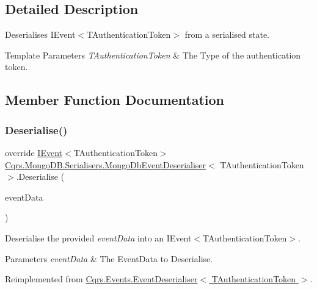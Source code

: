 \subsection{Detailed Description}
Deserialises I\+Event$<$\+T\+Authentication\+Token$>$ from a serialised state. 


\begin{DoxyTemplParams}{Template Parameters}
{\em T\+Authentication\+Token} & The Type of the authentication token.\\
\hline
\end{DoxyTemplParams}


\subsection{Member Function Documentation}
\mbox{\label{classCqrs_1_1MongoDB_1_1Serialisers_1_1MongoDbEventDeserialiser_a2ea63367d97bf66e3dffcabb8c53005e_a2ea63367d97bf66e3dffcabb8c53005e}} 
\subsubsection{\texorpdfstring{Deserialise()}{Deserialise()}}
{\footnotesize\ttfamily override \hyperlink{interfaceCqrs_1_1Events_1_1IEvent}{I\+Event}$<$T\+Authentication\+Token$>$ \hyperlink{classCqrs_1_1MongoDB_1_1Serialisers_1_1MongoDbEventDeserialiser}{Cqrs.\+Mongo\+D\+B.\+Serialisers.\+Mongo\+Db\+Event\+Deserialiser}$<$ T\+Authentication\+Token $>$.Deserialise (\begin{DoxyParamCaption}\item[{\hyperlink{classCqrs_1_1Events_1_1EventData}{Event\+Data}}]{event\+Data }\end{DoxyParamCaption})\hspace{0.3cm}{\ttfamily [virtual]}}



Deserialise the provided {\itshape event\+Data}  into an I\+Event$<$\+T\+Authentication\+Token$>$. 


\begin{DoxyParams}{Parameters}
{\em event\+Data} & The Event\+Data to Deserialise.\\
\hline
\end{DoxyParams}


Reimplemented from \hyperlink{classCqrs_1_1Events_1_1EventDeserialiser_a193feac1d58446f0a7447d8ba04179fc_a193feac1d58446f0a7447d8ba04179fc}{Cqrs.\+Events.\+Event\+Deserialiser$<$ T\+Authentication\+Token $>$}.

